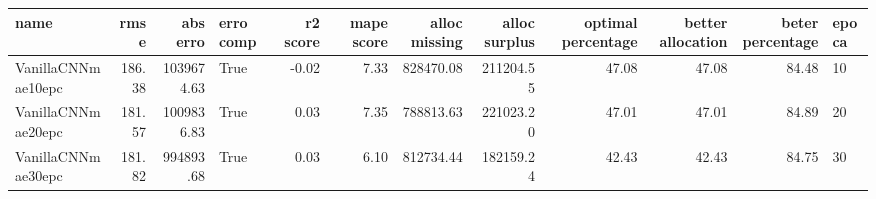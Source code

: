 \begin{tabular}{lrrlrrrrrrrl}
\toprule
name & rmse & abs erro & erro comp & r2 score & mape score & alloc missing & alloc surplus & optimal percentage & better allocation & beter percentage & epoca \\
\midrule
VanillaCNNmae10epc & 186.38 & 1039674.63 & True & -0.02 & 7.33 & 828470.08 & 211204.55 & 47.08 & 47.08 & 84.48 & 10 \\
VanillaCNNmae20epc & 181.57 & 1009836.83 & True & 0.03 & 7.35 & 788813.63 & 221023.20 & 47.01 & 47.01 & 84.89 & 20 \\
VanillaCNNmae30epc & 181.82 & 994893.68 & True & 0.03 & 6.10 & 812734.44 & 182159.24 & 42.43 & 42.43 & 84.75 & 30 \\
\bottomrule
\end{tabular}
